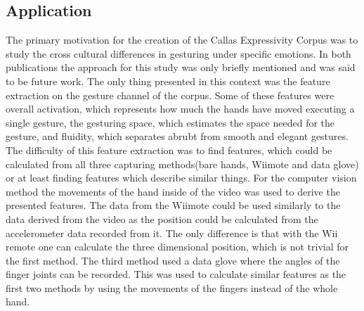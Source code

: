 \documentclass[a4paper]{article}
\begin{document}
		\subsection{Application}
			The primary motivation for the creation of the Callas Expressivity Corpus was to study the cross cultural differences in gesturing under specific emotions. In both publications \cite{2010MultimodalCorpusForGestureExpressivity, Caridakis2013} the approach for this study was only briefly mentioned and was said to be future work. The only thing presented in this context was the feature extraction on the gesture channel of the corpus. Some of these features were overall activation, which represents how much the hands have moved executing a single gesture, the gesturing space, which estimates the space needed for the gesture, and fluidity, which separates abrubt from smooth and elegant gestures. The difficulty of this feature extraction was to find features, which could be calculated from all three capturing methods(bare hands, Wiimote and data glove) or at least finding features which describe similar things. For the computer vision method the movements of the hand inside of the video was used to derive the presented features. The data from the Wiimote could be used similarly to the data derived from the video as the position could be calculated from the accelerometer data recorded from it. The only difference is that with the Wii remote one can calculate the three dimensional position, which is not trivial for the first method. The third method used a data glove where the angles of the finger joints can be recorded. This was used to calculate similar features as the first two methods by using the movements of the fingers instead of the whole hand. \\
\end{document}
